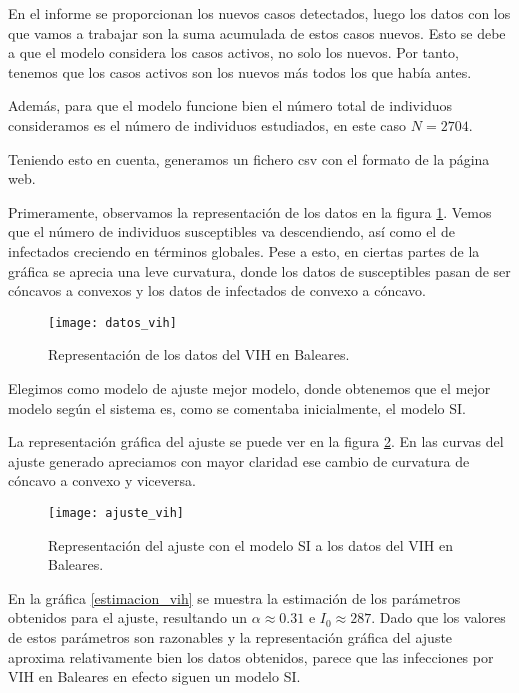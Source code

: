 En el informe se proporcionan los nuevos casos detectados, luego los datos con los que vamos a trabajar son la suma acumulada de estos casos nuevos. Esto se debe a que el modelo considera los casos activos, no solo los nuevos. Por tanto, tenemos que los casos activos son los nuevos más todos los que había antes.

Además, para que el modelo funcione bien el número total de individuos consideramos es el número de individuos estudiados, en este caso $N=2704$.

Teniendo esto en cuenta, generamos un fichero csv con el formato de la página web.

Primeramente, observamos la representación de los datos en la figura \ref{datos_vih}. Vemos que el número de individuos susceptibles va descendiendo, así como el de infectados creciendo en términos globales. Pese a esto, en ciertas partes de la gráfica se aprecia una leve curvatura, donde los datos de susceptibles pasan de ser cóncavos a convexos y los datos de infectados de convexo a cóncavo.

\begin{figure}
\begin{center}
\caption{Representación de los datos del VIH en Baleares.}
\label{datos_vih}
\texttt{[image: datos\_vih]}
\end{center}
\end{figure}

Elegimos como modelo de ajuste mejor modelo, donde obtenemos que el mejor modelo según el sistema es, como se comentaba inicialmente, el modelo SI.

La representación gráfica del ajuste se puede ver en la figura \ref{ajuste_vih}. En las curvas del ajuste generado apreciamos con mayor claridad ese cambio de curvatura de cóncavo a convexo y viceversa. 

\begin{figure}
\begin{center}
\caption{Representación del ajuste con el modelo SI a los datos del VIH en Baleares.}
\label{ajuste_vih}
\texttt{[image: ajuste\_vih]}
\end{center}
\end{figure}

En  la gráfica \ref{estimacion_vih} se muestra la estimación de los parámetros obtenidos para el ajuste, resultando un $\alpha \approx 0.31$ e $I_0 \approx 287$. Dado que los valores de estos parámetros son razonables y la representación gráfica del ajuste aproxima relativamente bien los datos obtenidos, parece que las infecciones por VIH en Baleares en efecto siguen un modelo SI.

